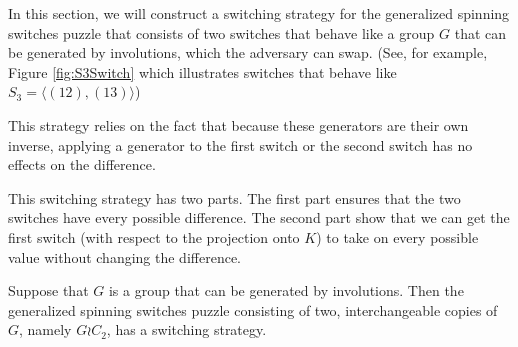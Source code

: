 In this section, we will construct a switching strategy for the generalized
spinning switches puzzle that consists of two switches that behave like
a group $G$ that can be generated by involutions, which the adversary can
swap.
(See, for example, Figure \ref{fig:S3Switch} which illustrates switches that
behave like $S_3 = \langle (12), (13)\rangle$)

This strategy relies on the fact that because these generators are their own
inverse, applying a generator to the first switch or the second switch
has no effects on the difference.

This switching strategy has two parts.
The first part ensures that the two switches have every possible difference.
The second part show that we can get the first switch
(with respect to the projection onto $K$)
to take on every possible value without changing the difference.
\begin{theorem}
  Suppose that $G$ is a group that can be generated by involutions.
  Then the generalized spinning switches puzzle consisting of two,
  interchangeable copies of $G$, namely $G \wr C_2$,
  has a switching strategy.
  \label{thm:involutionGeneratedGroups}
\end{theorem}
